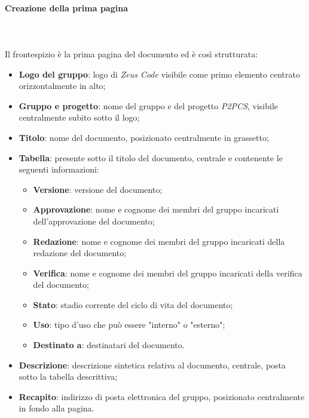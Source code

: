 		\paragraph{Creazione della prima pagina} \mbox{}\\ \mbox{}\\
		Il frontespizio è la prima pagina del documento ed è così strutturata:
		\begin{itemize}
			\item \textbf{Logo del gruppo}: logo di \textit{Zeus Code} visibile come primo elemento centrato orizzontalmente in alto;
			\item \textbf{Gruppo e progetto}: nome del gruppo e del progetto \textit{P2PCS}, visibile centralmente subito sotto il logo;
			\item \textbf{Titolo}: nome del documento, posizionato centralmente in grassetto;
			\item \textbf{Tabella}: presente sotto il titolo del documento, centrale e contenente le seguenti informazioni:
			\begin{itemize}
				\item \textbf{Versione}: versione del documento;
				\item \textbf{Approvazione}: nome e cognome dei membri del gruppo incaricati dell'approvazione del documento;
				\item \textbf{Redazione}: nome e cognome dei membri del gruppo incaricati della redazione del documento;
				\item \textbf{Verifica}: nome e cognome dei membri del gruppo incaricati della verifica del documento;
				\item \textbf{Stato}: stadio corrente del ciclo di vita del documento;
				\item \textbf{Uso}: tipo d'uso che può essere "interno" o "esterno";
				\item \textbf{Destinato a}: destinatari del documento.
			\end{itemize}
			\item \textbf{Descrizione}: descrizione sintetica relativa al documento, centrale, posta sotto la tabella descrittiva;
			\item \textbf{Recapito}: indirizzo di posta elettronica del gruppo, posizionato centralmente in fondo alla pagina.
		\end{itemize}
